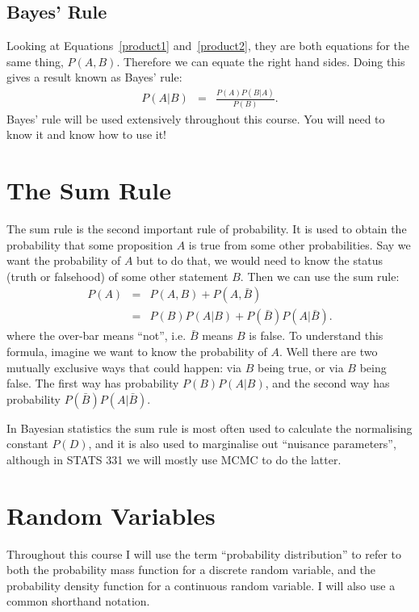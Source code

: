 \subsection{Bayes' Rule}
Looking at Equations~\ref{product1} and~\ref{product2}, they are both equations
for the same
thing, $P(A,B)$. Therefore we can equate the right hand sides. Doing this gives
a result known as Bayes' rule:
\begin{eqnarray}
P(A|B) &=& \frac{P(A)P(B|A)}{P(B)}. \label{bayes}
\end{eqnarray}
Bayes' rule will be used extensively throughout this course. You will need to
know it and know how to use it!

\section{The Sum Rule}
The sum rule is the second important rule of probability. It is used to obtain
the probability that some proposition $A$ is true from some other
probabilities. Say we want the probability of $A$ but to do that, we would need
to know the status (truth or falsehood) of some other statement $B$. Then we
can use the sum rule:
\begin{eqnarray}
P(A) &=& P(A, B) + P(A, \bar{B})\\
&=& P(B)P(A|B) + P(\bar{B})P(A|\bar{B}).
\end{eqnarray}
where the over-bar means ``not'', i.e. $\bar{B}$ means $B$ is false. To understand
this formula, imagine we want to know the probability of $A$. Well there are
two mutually exclusive ways that could happen: via $B$ being true, or via $B$
being false. The first way has probability $P(B)P(A|B)$, and the second way
has probability $P(\bar{B})P(A|\bar{B})$.

In Bayesian statistics the sum rule is most often used to calculate the
normalising constant $P(D)$, and it is also used to marginalise out ``nuisance
parameters'', although in STATS 331 we will mostly use MCMC to do the latter.

\section{Random Variables}
Throughout this course I will use the term ``probability distribution'' to
refer to both the probability mass function for a discrete random variable, and
the probability density function for a continuous random variable. I will also
use a common shorthand notation.

